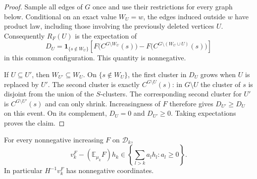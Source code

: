 \begin{proof}
Sample all edges of $G$ once and use their restrictions for every graph
below.  Conditional on an exact value $W_U=w$, the edges induced outside
$w$ have product law, including those involving the previously deleted
vertices $U$.  Consequently $R_F(U)$ is the expectation of
\[
 D_U=\mathbf1_{\{s\notin W_U\}}
 \left[F\bigl(C^{G\setminus W_U}(s)\bigr)
       -F\bigl(C^{G\setminus(W_U\cup U)}(s)\bigr)\right]
\]
in this common configuration.  This quantity is nonnegative.

If $U\subseteq U'$, then $W_{U'}\subseteq W_U$.  On
$\{s\notin W_U\}$, the first cluster in $D_U$ grows when $U$ is replaced
by $U'$.  The second cluster is exactly $C^{G\setminus U}(s)$: in
$G\setminus U$ the cluster of $s$ is disjoint from the union of the
$S$-clusters.  The corresponding second cluster for $U'$ is
$C^{G\setminus U'}(s)$ and can only shrink.  Increasingness of $F$
therefore gives $D_{U'}\ge D_U$ on this event.  On its complement,
$D_U=0$ and $D_{U'}\ge0$.  Taking expectations proves the claim.
\end{proof}

\begin{lemma}
\label{lem:cluster-column}
For every nonnegative increasing $F$ on $\mathcal D_k$,
\begin{equation}
\label{eq:cluster-column}
 v_k^F-(\mathbb E_{\mu_k}F)h_k
       \in\left\{\sum_{l>k}a_lh_l:a_l\ge0\right\}.
\end{equation}
In particular $H^{-1}v_k^F$ has nonnegative coordinates.
\end{lemma}

